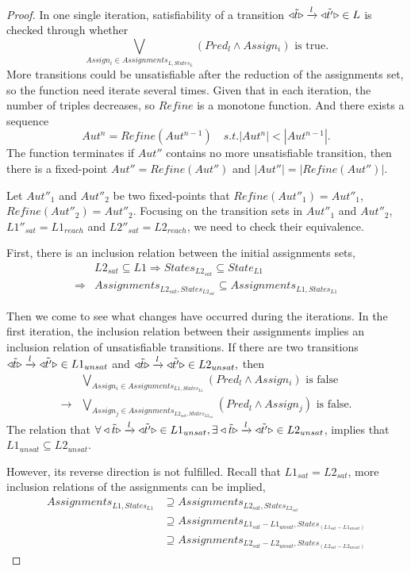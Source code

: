 \documentclass[smallcondensed]{svjour3}
\begin{document}
\begin{proof}
In one single iteration, satisfiability of a transition $\triangleleft{\tilde{t}}\triangleright\xrightarrow{l}\triangleleft{\tilde{t'}}\triangleright\in L$ is checked through whether 
\[\bigvee_{Assign_i\in Assignments_{L, States_{L}}}(Pred_{l}\wedge Assign_{i})\text{ is true}.\]
More transitions could be unsatisfiable after the reduction of the assignments set, so the function need iterate several times. Given that in each iteration, the number of triples decreases, so $Refine$ is a monotone function. And there exists a sequence \[Aut^n = Refine(Aut^{n-1})\quad s.t. |Aut^n| < |Aut^{n-1}|.\]
The function terminates if $Aut''$ contains no more unsatisfiable transition, then there is a fixed-point $Aut'' = Refine(Aut'')$ and $|Aut''| = |Refine(Aut'')|$.

Let $Aut''_1$ and $Aut''_2$ be two fixed-points that $Refine(Aut''_1) = Aut''_1$, $Refine(Aut''_2) = Aut''_2$. Focusing on the transition sets in $Aut''_1$ and $Aut''_2$, $L1''_{sat}=L1_{reach}$ and $L2''_{sat}=L2_{reach}$, we need to check their equivalence.

First, there is an inclusion relation between the initial assignments sets, 
\begin{align*}
&L2_{sat}\subseteq L1\Rightarrow States_{L2_{sat}}\subseteq State_{L1}\\
\Rightarrow &Assignments_{L2_{sat}, States_{L2_{sat}}}\subseteq Assignments_{L1, States_{L1}}
\end{align*}

Then we come to see what changes have occurred during the iterations. In the first iteration, the inclusion relation between their assignments implies an inclusion relation of unsatisfiable transitions. If there are two transitions $\triangleleft{\tilde{t}}\triangleright\xrightarrow{l}\triangleleft{\tilde{t'}}\triangleright \in L1_{unsat}$ and $\triangleleft{\tilde{t}}\triangleright\xrightarrow{l}\triangleleft{\tilde{t'}}\triangleright \in L2_{unsat},$ then
\begin{align*}
&\bigvee_{Assign_i\in Assignments_{L1, States_{L1}}} (Pred_{l}\wedge Assign_i)\text{ is false}\\
\longrightarrow&\bigvee_{Assign_j\in Assignments_{L2_{sat}, States_{L2_{sat}}}} (Pred_{l}\wedge Assign_j)\text{ is false}.
\end{align*}
The relation that $\forall\triangleleft{\tilde{t}}\triangleright\xrightarrow{l}\triangleleft{\tilde{t'}}\triangleright \in L1_{unsat},\exists\triangleleft{\tilde{t}}\triangleright\xrightarrow{l}\triangleleft{\tilde{t'}}\triangleright \in L2_{unsat}$, implies that $L1_{unsat}\subseteq L2_{unsat}.$

However, its reverse direction is not fulfilled. Recall that $L1_{sat}=L2_{sat}$, more inclusion relations of the assignments can be implied,
\begin{align*}
Assignments_{L1, States_{L1}}&\supseteq Assignments_{L2_{sat}, States_{L2_{sat}}}\\
&\supseteq Assignments_{L1_{sat}-L1_{unsat}, States_{(L1_{sat}-L1_{unsat})}}\\
&\supseteq Assignments_{L2_{sat}-L2_{unsat}, States_{(L2_{sat}-L2_{unsat})}}
\end{align*}


\end{proof}
\end{document}
